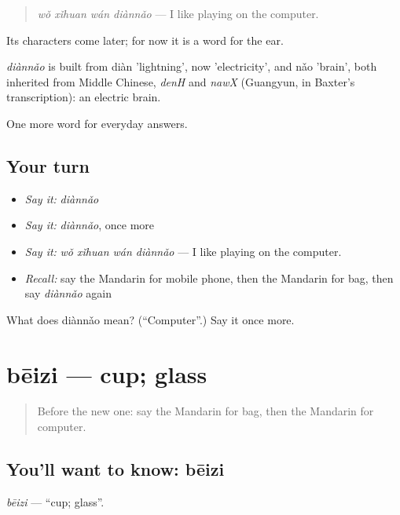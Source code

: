 \begin{quote}
\emph{wǒ xǐhuan wán diànnǎo} — I like playing on the computer.
\end{quote}

Its characters come later; for now it is a word for the ear.

\begin{cousinweb}
\emph{diànnǎo} is built from diàn 'lightning', now 'electricity', and nǎo 'brain', both inherited from Middle Chinese, \emph{denH} and \emph{nawX} (Guangyun, in Baxter's transcription): an electric brain.
\end{cousinweb}

\begin{grammarlens}[title={What you've built}]
One more word for everyday answers.
\end{grammarlens}

\subsection*{Your turn}
\begin{itemize}
\raggedright
  \item \emph{Say it:} \emph{diànnǎo}
  \item \emph{Say it:} \emph{diànnǎo}, once more
  \item \emph{Say it:} \emph{wǒ xǐhuan wán diànnǎo} — I like playing on the computer.
  \item \emph{Recall:} say the Mandarin for mobile phone, then the Mandarin for bag, then say \emph{diànnǎo} again
\end{itemize}

\begin{tcolorbox}[breakable,colback=teal!4,colframe=teal!35!black,title={Before you move on}]
What does diànnǎo mean? (\textquotedblleft{}Computer\textquotedblright{}.) Say it once more.
\end{tcolorbox}
\section[bēizi]{bēizi — cup; glass}

\label{lesson:ZH-C58-beizi}



\begin{quote}
Before the new one: say the Mandarin for bag, then the Mandarin for computer.
\end{quote}

\subsection*{You'll want to know: bēizi}
\emph{bēizi} — \textquotedblleft{}cup; glass\textquotedblright{}.

